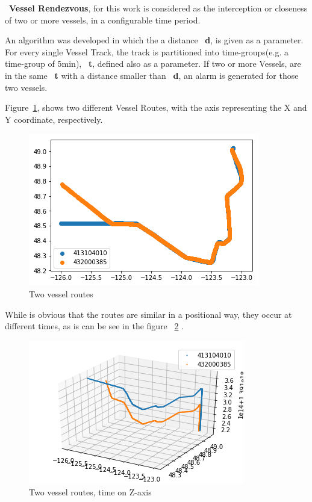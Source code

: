 ~\textbf{Vessel Rendezvous}, for this work is considered as the interception or closeness of two or more vessels, in a configurable time period.

An algorithm was developed in which the a distance ~\textbf{d}, is given as a parameter. For every single Vessel Track, the track is partitioned into time-groups(e.g. a time-group of 5min), ~\textbf{t}, defined also as a parameter. If two or more Vessels, are in the same ~\textbf{t} with a distance smaller than ~\textbf{d}, an alarm is generated for those two vessels.

Figure~\ref{fig: VesselRendevouz2d}, shows two different Vessel Routes, with the axis representing the X and Y coordinate, respectively.

\begin{figure}[H]
	\centering
	\includegraphics[scale = .8]{figures/VesselRendevouz2d}
    \caption{Two vessel routes}
    \label{fig: VesselRendevouz2d}
\end{figure}

While is obvious that the routes are similar in a positional way, they occur at different times, as is can be see in the figure ~\ref{fig: VesselRendevouz3d} .

\begin{figure}[H]
	\centering
	\includegraphics[scale = .9]{figures/VesselRendevouz3d}
    \caption{Two vessel routes, time on Z-axis}
    \label{fig: VesselRendevouz3d}
\end{figure}


   



